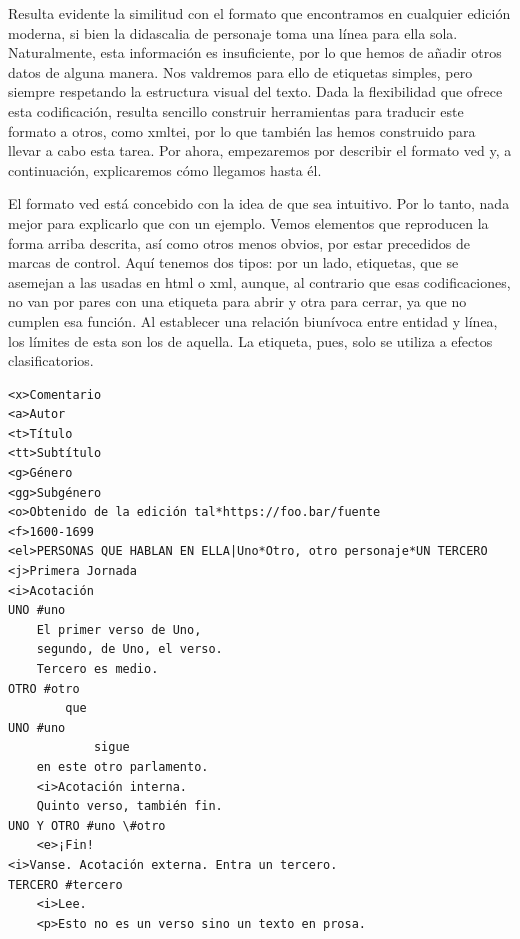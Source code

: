Resulta evidente la similitud con el formato que encontramos en cualquier edición moderna, si bien la didascalia de personaje toma una línea para ella sola. Naturalmente, esta información es insuficiente, por lo que hemos de añadir otros datos de alguna manera. Nos valdremos para ello de etiquetas simples, pero siempre respetando la estructura visual del texto. Dada la flexibilidad que ofrece esta codificación, resulta sencillo construir herramientas para traducir este formato a otros, como \ac{xmltei}, por lo que también las hemos construido para llevar a cabo esta tarea. Por ahora, empezaremos por describir el formato \ac{ved} y, a continuación, explicaremos cómo llegamos hasta él.

El formato \ac{ved} está concebido con la idea de que sea intuitivo. Por lo tanto, nada mejor para explicarlo que con un ejemplo. Vemos elementos que reproducen la forma arriba descrita, así como otros menos obvios, por estar precedidos de marcas de control.  Aquí tenemos dos tipos: por un lado, etiquetas, que se asemejan a las usadas en \ac{html} o \ac{xml}, aunque, al contrario que esas codificaciones, no van por pares con una etiqueta para abrir y otra para cerrar, ya que no cumplen esa función. Al establecer una relación biunívoca entre entidad y línea, los límites de esta son los de aquella. La etiqueta, pues, solo se utiliza a efectos clasificatorios.

\begin{lstlisting}[frame=none,numbers=none,caption={Ejemplo de archivo VED.},label={ex:ved}]
<x>Comentario
<a>Autor
<t>Título
<tt>Subtítulo
<g>Género
<gg>Subgénero
<o>Obtenido de la edición tal*https://foo.bar/fuente
<f>1600-1699
<el>PERSONAS QUE HABLAN EN ELLA|Uno*Otro, otro personaje*UN TERCERO
<j>Primera Jornada
<i>Acotación
UNO #uno
	El primer verso de Uno,
	segundo, de Uno, el verso.
	Tercero es medio.
OTRO #otro
		que
UNO #uno
			sigue
	en este otro parlamento.
	<i>Acotación interna.
	Quinto verso, también fin.
UNO Y OTRO #uno \#otro
	<e>¡Fin!
<i>Vanse. Acotación externa. Entra un tercero.
TERCERO #tercero
	<i>Lee.
	<p>Esto no es un verso sino un texto en prosa.
\end{lstlisting}

